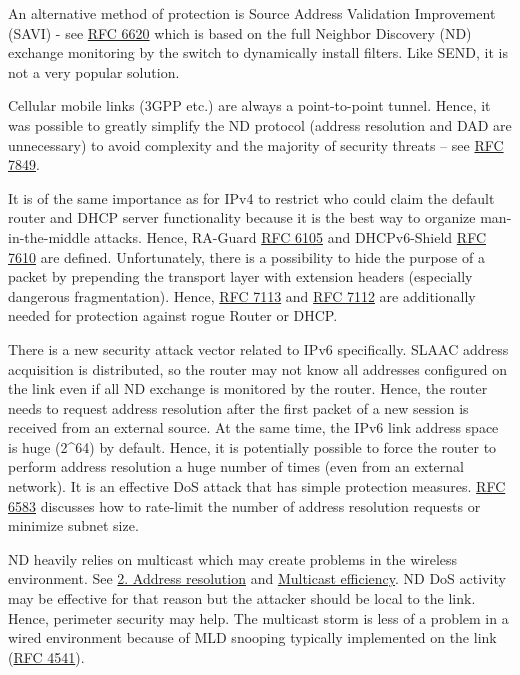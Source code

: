 \documentclass[
]{article}
\begin{document}
An alternative method of protection is Source Address Validation
Improvement (SAVI) - see
\href{https://www.rfc-editor.org/info/rfc6620}{RFC 6620} which is based
on the full Neighbor Discovery (ND) exchange monitoring by the switch to
dynamically install filters. Like SEND, it is not a very popular
solution.

Cellular mobile links (3GPP etc.) are always a point-to-point tunnel.
Hence, it was possible to greatly simplify the ND protocol (address
resolution and DAD are unnecessary) to avoid complexity and the majority
of security threats -- see
\href{https://www.rfc-editor.org/info/rfc7849}{RFC 7849}.

It is of the same importance as for IPv4 to restrict who could claim the
default router and DHCP server functionality because it is the best way
to organize man-in-the-middle attacks. Hence, RA-Guard
\href{https://www.rfc-editor.org/info/rfc6105}{RFC 6105} and
DHCPv6-Shield \href{https://www.rfc-editor.org/info/rfc7610}{RFC 7610}
are defined. Unfortunately, there is a possibility to hide the purpose
of a packet by prepending the transport layer with extension headers
(especially dangerous fragmentation). Hence,
\href{https://www.rfc-editor.org/info/rfc7113}{RFC 7113} and
\href{https://www.rfc-editor.org/info/rfc7112}{RFC 7112} are
additionally needed for protection against rogue Router or DHCP.

There is a new security attack vector related to IPv6 specifically.
SLAAC address acquisition is distributed, so the router may not know all
addresses configured on the link even if all ND exchange is monitored by
the router. Hence, the router needs to request address resolution after
the first packet of a new session is received from an external source.
At the same time, the IPv6 link address space is huge (2\^{}64) by
default. Hence, it is potentially possible to force the router to
perform address resolution a huge number of times (even from an external
network). It is an effective DoS attack that has simple protection
measures. \href{https://www.rfc-editor.org/info/rfc6583}{RFC 6583}
discusses how to rate-limit the number of address resolution requests or
minimize subnet size.

ND heavily relies on multicast which may create problems in the wireless
environment. See \hyperref[address-resolution]{2. Address resolution}
and
\href{https://datatracker.ietf.org/doc/draft-vyncke-6man-mcast-not-efficient}{Multicast
efficiency}. ND DoS activity may be effective for that reason but the
attacker should be local to the link. Hence, perimeter security may
help. The multicast storm is less of a problem in a wired environment
because of MLD snooping typically implemented on the link
(\href{https://www.rfc-editor.org/info/rfc4541}{RFC 4541}).
\end{document}
